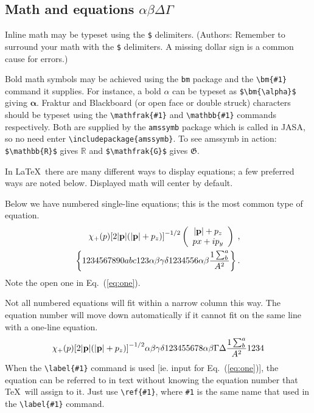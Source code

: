 \documentclass[reprint]{JASA}
\begin{document}
\subsection{\label{subsec:3:3} Math and equations $\alpha\beta\Delta\Gamma$}
Inline math may be typeset using the \verb+$+ delimiters.  (Authors:
Remember to surround your math with the \verb+$+ delimiters.  A missing dollar sign is a common cause for errors.)

Bold math
symbols may be achieved using the \verb+bm+ package and the
\verb+\bm{#1}+ command it supplies. For instance, a bold $\alpha$ can
be typeset as \verb+$\bm{\alpha}$+ giving $\bm{\alpha}$. Fraktur and
Blackboard (or open face or double struck) characters should be
typeset using the \verb+\mathfrak{#1}+ and \verb+\mathbb{#1}+ commands
respectively. Both are supplied by the \texttt{amssymb} package which
is called in JASA, so no need enter \verb+\includepackage{amssymb}+.
To see amssymb in action:
\verb+$\mathbb{R}$+ gives $\mathbb{R}$ and
\verb+$\mathfrak{G}$+ gives $\mathfrak{G}$.

In \LaTeX\ there are many different ways to display equations; a
few preferred ways are noted below. Displayed math will center by
default. 

Below we have numbered single-line equations; this is the most common
type of equation.
\begin{eqnarray}
\chi_+(p){\bf [}2|{\bf p}|(|{\bf p}|+p_z){\bf ]}^{-1/2}
\left(
\begin{array}{c}
|{\bf p}|+p_z\\
px+ip_y
\end{array}\right)\;,
\\
\left\{%
 1234567890abc123\alpha\beta\gamma\delta1234556\alpha\beta
 \frac{1\sum^{a}_{b}}{A^2}%
\right\}%
\label{eq:one}.
\end{eqnarray}
Note the open one in Eq.~(\ref{eq:one}).

Not all numbered equations will fit within a narrow column this
way. The equation number will move down automatically if it cannot fit
on the same line with a one-line equation.
\begin{equation}
\chi_+(p){\bf [}2|{\bf p}|(|{\bf p}|+p_z){\bf ]}^{-1/2}
\alpha\beta\gamma\delta123455678\alpha\beta\Gamma\Delta
 \frac{1\sum^{a}_{b}}{A^2}1234%
\end{equation}
When the \verb+\label{#1}+ command is used [ie. input for
Eq.~(\ref{eq:one})], the equation can be referred to in text without
knowing the equation number that \TeX\ will assign to it. Just
use \verb+\ref{#1}+, where \verb+#1+ is the same name that used in
the \verb+\label{#1}+ command.
\end{document}
